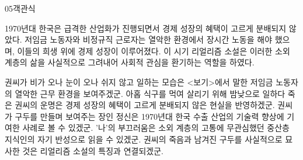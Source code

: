 \documentclass[fs85,seriesWit]{korfarm-base}
\begin{document}
\begin{kfQBlock}{05}{객관식}
\begin{kfEvidence}1970년대 한국은 급격한 산업화가 진행되면서 경제 성장의 혜택이 고르게 분배되지 않았다. 저임금 노동자와 비정규직 근로자는 열악한 환경에서 장시간 노동을 해야 했으며, 이들의 희생 위에 경제 성장이 이루어졌다. 이 시기 리얼리즘 소설은 이러한 소외 계층의 삶을 사실적으로 그려내어 사회적 관심을 환기하는 역할을 하였다.\end{kfEvidence}
\begin{kfChoices}
\kfChoice 권씨가 비가 오나 눈이 오나 쉬지 않고 일하는 모습은 <보기>에서 말한 저임금 노동자의 열악한 근무 환경을 보여주겠군.
\kfChoice 아홉 식구를 먹여 살리기 위해 밤낮으로 일하다 죽은 권씨의 운명은 경제 성장의 혜택이 고르게 분배되지 않은 현실을 반영하겠군.
\kfChoice 권씨가 구두를 만들며 보여주는 장인 정신은 1970년대 한국 수출 산업의 기술력 향상에 기여한 사례로 볼 수 있겠군.
\kfChoice '나'의 부끄러움은 소외 계층의 고통에 무관심했던 중산층 지식인의 자기 반성으로 읽을 수 있겠군.
\kfChoice 권씨의 죽음과 남겨진 구두를 사실적으로 묘사한 것은 리얼리즘 소설의 특징과 연결되겠군.
\end{kfChoices}
\end{kfQBlock}

\kfEndMC
\end{document}
